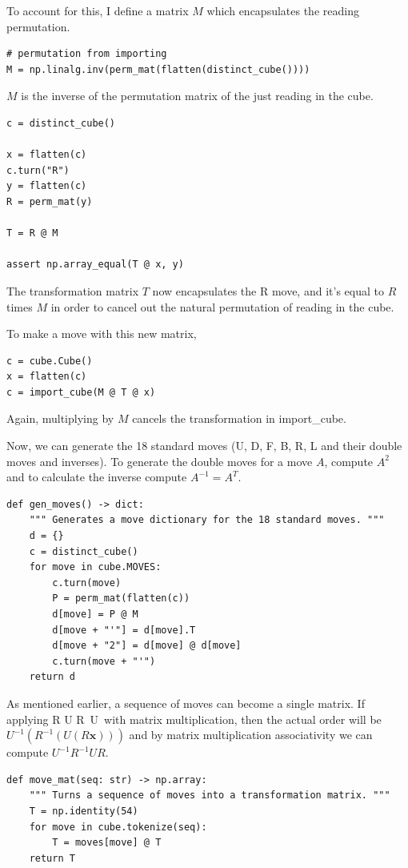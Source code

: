\documentclass[11pt, oneside]{article}
\newcommand{\dash}{\textquotesingle}
\newcommand{\ve}[1]{\mathbf{#1}}
\theoremstyle{plain}
\begin{document}
To account for this, I define a matrix \( M \)
which encapsulates the reading permutation.

\begin{verbatim}
# permutation from importing
M = np.linalg.inv(perm_mat(flatten(distinct_cube())))
\end{verbatim}

\( M \) is the inverse of the permutation
matrix of the just reading in the cube.

\begin{verbatim}
c = distinct_cube()

x = flatten(c)
c.turn("R")
y = flatten(c)
R = perm_mat(y)

T = R @ M

assert np.array_equal(T @ x, y)
\end{verbatim}

The transformation matrix \( T \) now encapsulates the R
move, and it's equal to \( R \) times \( M \) in order to
cancel out the natural permutation of reading in the cube.

To make a move with this new matrix,

\begin{verbatim}
c = cube.Cube()
x = flatten(c)
c = import_cube(M @ T @ x)
\end{verbatim}

Again, multiplying by \( M \) cancels the transformation in import\_cube.

Now, we can generate the 18 standard moves (U, D, F, B, R, L and their
double moves and inverses). To generate the double moves for a move \( A \),
compute \( A^2 \) and to calculate the inverse compute \( A^{-1} = A^T \).

\begin{verbatim}
def gen_moves() -> dict:
    """ Generates a move dictionary for the 18 standard moves. """
    d = {}
    c = distinct_cube()
    for move in cube.MOVES:
        c.turn(move)
        P = perm_mat(flatten(c))
        d[move] = P @ M
        d[move + "'"] = d[move].T
        d[move + "2"] = d[move] @ d[move]
        c.turn(move + "'")
    return d
\end{verbatim}

As mentioned earlier, a sequence of moves can become a single matrix. If
applying R U R\dash \ U\dash \ with matrix multiplication, then the actual
order will be \( U^{-1}(R^{-1}(U(R\ve{x}))) \) and by matrix multiplication
associativity we can compute \( U^{-1} R^{-1} U R \).
\begin{verbatim}
def move_mat(seq: str) -> np.array:
    """ Turns a sequence of moves into a transformation matrix. """
    T = np.identity(54)
    for move in cube.tokenize(seq):
        T = moves[move] @ T
    return T
\end{verbatim}
\end{document}
